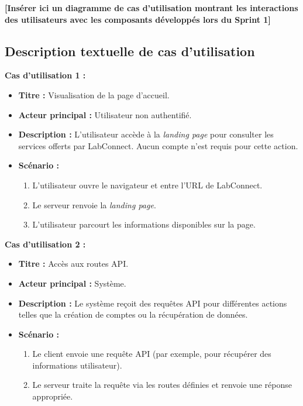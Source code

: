 \documentclass[12pt,a4paper]{report}
\begin{document}
\textbf{[Insérer ici un diagramme de cas d’utilisation montrant les interactions des utilisateurs avec les composants développés lors du Sprint 1]}

\subsection{Description textuelle de cas d’utilisation}

\textbf{Cas d’utilisation 1 :}

\begin{itemize}
    \item \textbf{Titre :} Visualisation de la page d'accueil.
    \item \textbf{Acteur principal :} Utilisateur non authentifié.
    \item \textbf{Description :} L’utilisateur accède à la \textit{landing page} pour consulter les services offerts par LabConnect. Aucun compte n'est requis pour cette action.
    \item \textbf{Scénario :}
    \begin{enumerate}
        \item L'utilisateur ouvre le navigateur et entre l'URL de LabConnect.
        \item Le serveur renvoie la \textit{landing page}.
        \item L'utilisateur parcourt les informations disponibles sur la page.
    \end{enumerate}
\end{itemize}

\textbf{Cas d’utilisation 2 :}

\begin{itemize}
    \item \textbf{Titre :} Accès aux routes API.
    \item \textbf{Acteur principal :} Système.
    \item \textbf{Description :} Le système reçoit des requêtes API pour différentes actions telles que la création de comptes ou la récupération de données.
    \item \textbf{Scénario :}
    \begin{enumerate}
        \item Le client envoie une requête API (par exemple, pour récupérer des informations utilisateur).
        \item Le serveur traite la requête via les routes définies et renvoie une réponse appropriée.
    \end{enumerate}
\end{itemize}
\end{document}

